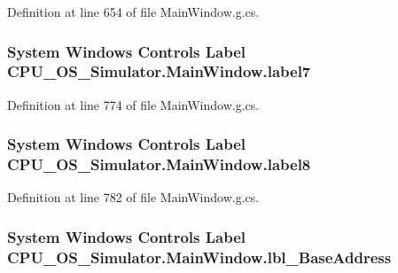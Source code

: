 Definition at line 654 of file Main\+Window.\+g.\+cs.

\hypertarget{class_c_p_u___o_s___simulator_1_1_main_window_a38ed6363fd03954967bda7a099f6b07e}{}
\subsubsection[{label7}]{\setlength{\rightskip}{0pt plus 5cm}System Windows Controls Label C\+P\+U\+\_\+\+O\+S\+\_\+\+Simulator.\+Main\+Window.\+label7\hspace{0.3cm}{\ttfamily [package]}}\label{class_c_p_u___o_s___simulator_1_1_main_window_a38ed6363fd03954967bda7a099f6b07e}


Definition at line 774 of file Main\+Window.\+g.\+cs.

\hypertarget{class_c_p_u___o_s___simulator_1_1_main_window_a216fc6a1692d8a8f8b80b08348c1dcd4}{}
\subsubsection[{label8}]{\setlength{\rightskip}{0pt plus 5cm}System Windows Controls Label C\+P\+U\+\_\+\+O\+S\+\_\+\+Simulator.\+Main\+Window.\+label8\hspace{0.3cm}{\ttfamily [package]}}\label{class_c_p_u___o_s___simulator_1_1_main_window_a216fc6a1692d8a8f8b80b08348c1dcd4}


Definition at line 782 of file Main\+Window.\+g.\+cs.

\hypertarget{class_c_p_u___o_s___simulator_1_1_main_window_ae3adff2ef98d792ce094dcc229c293a8}{}
\subsubsection[{lbl\+\_\+\+Base\+Address}]{\setlength{\rightskip}{0pt plus 5cm}System Windows Controls Label C\+P\+U\+\_\+\+O\+S\+\_\+\+Simulator.\+Main\+Window.\+lbl\+\_\+\+Base\+Address\hspace{0.3cm}{\ttfamily [package]}}\label{class_c_p_u___o_s___simulator_1_1_main_window_ae3adff2ef98d792ce094dcc229c293a8}


